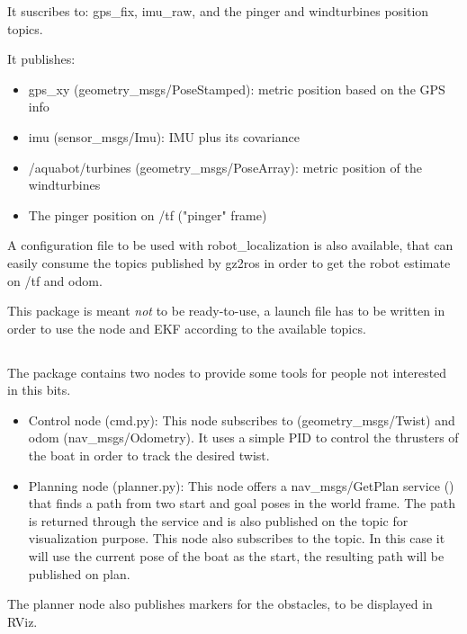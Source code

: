 \documentclass{ecnreport}
\begin{document}
It suscribes to: gps\_fix, imu\_raw, and the pinger and windturbines position topics.

It publishes:
\begin{itemize}
 \item gps\_xy (geometry\_msgs/PoseStamped): metric position based on the GPS info
\item imu (sensor\_msgs/Imu): IMU plus its covariance
\item /aquabot/turbines (geometry\_msgs/PoseArray): metric position of the windturbines
\item The pinger position on /tf ("pinger" frame)
\end{itemize}


A configuration file to be used with robot\_localization is also available, that can easily consume the topics published by gz2ros in order to get the robot estimate on /tf and odom.

This package is meant \emph{not} to be ready-to-use, a launch file has to be written in order to use the node and EKF according to the available topics.

\subsection{}

The  package contains two nodes to provide some tools for people not interested in this bits.

\begin{itemize}
 \item Control node (cmd.py): This node subscribes to  (geometry\_msgs/Twist) and odom (nav\_msgs/Odometry). It uses a simple PID to control the thrusters of the boat in order to track the desired twist.
 \item Planning node (planner.py): This node offers a nav\_msgs/GetPlan service () that finds a path from two start and goal poses in the world
frame. The path is returned through the service and is also published on the  topic for visualization purpose. This node also subscribes
to the  topic. In this case it will use the current pose of the boat as the start, the resulting path will be published on plan.
\end{itemize}

The planner node also publishes markers for the obstacles, to be displayed in RViz.
\end{document}
